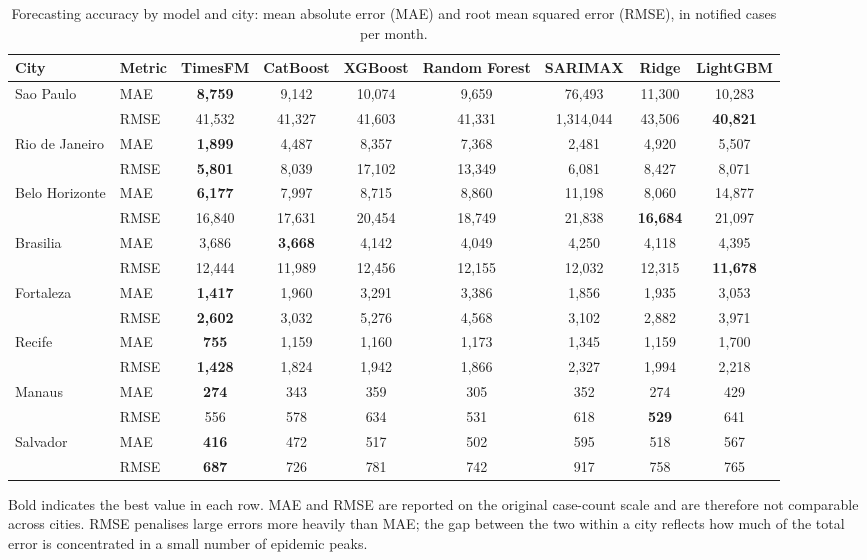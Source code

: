 \begin{table}[htbp]
\centering
\small
\setlength{\tabcolsep}{4pt}
\caption{Forecasting accuracy by model and city: mean absolute error (MAE) and root
mean squared error (RMSE), in notified cases per month.}
\label{tab:mae-rmse}
\begin{tabular}{llccccccc}
\toprule
City & Metric & TimesFM & CatBoost & XGBoost & Random Forest & SARIMAX & Ridge & LightGBM \\
\midrule
\multirow{2}{*}{Sao Paulo} & MAE & \textbf{8,759} & 9,142 & 10,074 & 9,659 & 76,493 & 11,300 & 10,283 \\
 & RMSE & 41,532 & 41,327 & 41,603 & 41,331 & 1,314,044 & 43,506 & \textbf{40,821} \\[2pt]
\multirow{2}{*}{Rio de Janeiro} & MAE & \textbf{1,899} & 4,487 & 8,357 & 7,368 & 2,481 & 4,920 & 5,507 \\
 & RMSE & \textbf{5,801} & 8,039 & 17,102 & 13,349 & 6,081 & 8,427 & 8,071 \\[2pt]
\multirow{2}{*}{Belo Horizonte} & MAE & \textbf{6,177} & 7,997 & 8,715 & 8,860 & 11,198 & 8,060 & 14,877 \\
 & RMSE & 16,840 & 17,631 & 20,454 & 18,749 & 21,838 & \textbf{16,684} & 21,097 \\[2pt]
\multirow{2}{*}{Brasilia} & MAE & 3,686 & \textbf{3,668} & 4,142 & 4,049 & 4,250 & 4,118 & 4,395 \\
 & RMSE & 12,444 & 11,989 & 12,456 & 12,155 & 12,032 & 12,315 & \textbf{11,678} \\[2pt]
\multirow{2}{*}{Fortaleza} & MAE & \textbf{1,417} & 1,960 & 3,291 & 3,386 & 1,856 & 1,935 & 3,053 \\
 & RMSE & \textbf{2,602} & 3,032 & 5,276 & 4,568 & 3,102 & 2,882 & 3,971 \\[2pt]
\multirow{2}{*}{Recife} & MAE & \textbf{755} & 1,159 & 1,160 & 1,173 & 1,345 & 1,159 & 1,700 \\
 & RMSE & \textbf{1,428} & 1,824 & 1,942 & 1,866 & 2,327 & 1,994 & 2,218 \\[2pt]
\multirow{2}{*}{Manaus} & MAE & \textbf{274} & 343 & 359 & 305 & 352 & 274 & 429 \\
 & RMSE & 556 & 578 & 634 & 531 & 618 & \textbf{529} & 641 \\[2pt]
\multirow{2}{*}{Salvador} & MAE & \textbf{416} & 472 & 517 & 502 & 595 & 518 & 567 \\
 & RMSE & \textbf{687} & 726 & 781 & 742 & 917 & 758 & 765 \\[2pt]
\bottomrule
\end{tabular}

\vspace{0.5em}
\begin{minipage}{\textwidth}
\footnotesize
Bold indicates the best value in each row. MAE and RMSE are reported on the original
case-count scale and are therefore not comparable across cities. RMSE penalises large
errors more heavily than MAE; the gap between the two within a city reflects how much
of the total error is concentrated in a small number of epidemic peaks.
\end{minipage}
\end{table}
